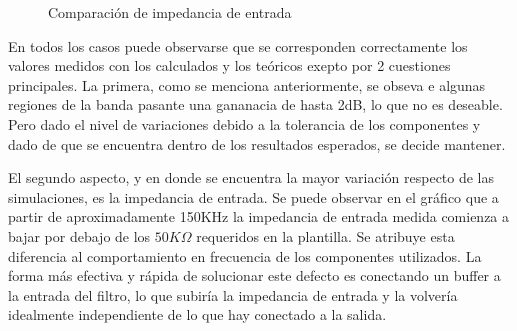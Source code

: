 \begin{figure}[H]
    \centering
    \caption{Comparaci\'on de impedancia de entrada}
    \label{fig:ZIN}
\end{figure}
En todos los casos puede observarse que se corresponden correctamente los valores medidos con los calculados y los te\'oricos exepto por 2 cuestiones principales. La primera, como se menciona anteriormente, se obseva e algunas regiones de la banda pasante una gananacia de hasta 2dB, lo que no es deseable. Pero dado el nivel de variaciones debido a la tolerancia de los componentes y dado de que se encuentra dentro de los resultados esperados, se decide mantener.

El segundo aspecto, y en donde se encuentra la mayor variaci\'on respecto de las simulaciones, es la impedancia de entrada. Se puede observar en el gr\'afico que a partir de aproximadamente 150KHz la impedancia de entrada medida comienza a bajar por debajo de los $50K\Omega$ requeridos en la plantilla. Se atribuye esta diferencia al comportamiento en frecuencia de los componentes utilizados. La forma m\'as efectiva y r\'apida de solucionar este defecto es conectando un buffer a la entrada del filtro, lo que subir\'ia la impedancia de entrada y la volver\'ia idealmente independiente de lo que hay conectado a la salida.


